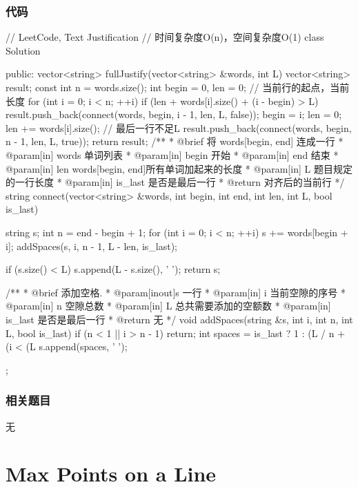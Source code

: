 \subsubsection{代码}
\begin{Code}
// LeetCode, Text Justification
// 时间复杂度O(n)，空间复杂度O(1)
class Solution {
public:
    vector<string> fullJustify(vector<string> &words, int L) {
        vector<string> result;
        const int n = words.size();
        int begin = 0, len = 0; // 当前行的起点，当前长度
        for (int i = 0; i < n; ++i) {
            if (len + words[i].size() + (i - begin) > L) {
                result.push_back(connect(words, begin, i - 1, len, L, false));
                begin = i;
                len = 0;
            }
            len += words[i].size();
        }
        // 最后一行不足L
        result.push_back(connect(words, begin, n - 1, len, L, true));
        return result;
    }
    /**
     * @brief 将 words[begin, end] 连成一行
     * @param[in] words 单词列表
     * @param[in] begin 开始
     * @param[in] end 结束
     * @param[in] len words[begin, end]所有单词加起来的长度
     * @param[in] L 题目规定的一行长度
     * @param[in] is_last 是否是最后一行
     * @return 对齐后的当前行
     */
    string connect(vector<string> &words, int begin, int end,
            int len, int L, bool is_last) {
        string s;
        int n = end - begin + 1;
        for (int i = 0; i < n; ++i) {
            s += words[begin + i];
            addSpaces(s, i, n - 1, L - len, is_last);
        }

        if (s.size() < L) s.append(L - s.size(), ' ');
        return s;
    }

    /**
     * @brief 添加空格.
     * @param[inout]s 一行
     * @param[in] i 当前空隙的序号
     * @param[in] n 空隙总数
     * @param[in] L 总共需要添加的空额数
     * @param[in] is_last 是否是最后一行
     * @return 无
     */
    void addSpaces(string &s, int i, int n, int L, bool is_last) {
        if (n < 1 || i > n - 1) return;
        int spaces = is_last ? 1 : (L / n + (i < (L %
        s.append(spaces, ' ');
    }
};
\end{Code}


\subsubsection{相关题目}
\begindot
\item 无
\myenddot


\section{Max Points on a Line} %
\label{sec:max-points-on-a-line}


